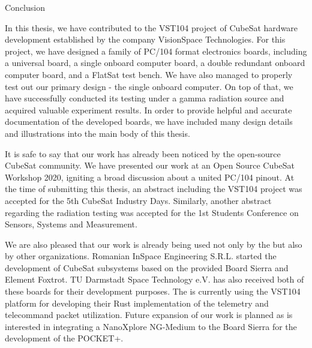 

\chap Conclusion

\quad In this thesis, we have contributed to the VST104 project of CubeSat hardware development established by the company VisionSpace Technologies. For this project, we have designed a family of PC/104 format electronics boards, including a universal board, a single onboard computer board, a double redundant onboard computer board, and a FlatSat test bench. We have also managed to properly test out our primary design - the single onboard computer. On top of that, we have successfully conducted its testing under a gamma radiation source and acquired valuable experiment results. In order to provide helpful and accurate documentation of the developed boards, we have included many design details and illustrations into the main body of this thesis.

It is safe to say that our work has already been noticed by the open-source CubeSat community. We have presented our work at an Open Source CubeSat Workshop 2020, igniting a broad discussion about a united PC/104 pinout. At the time of submitting this thesis, an abstract including the VST104 project was accepted for the 5th  CubeSat Industry Days. Similarly, another abstract regarding the radiation testing was accepted for the 1st Students Conference on Sensors, Systems and Measurement.

We are also pleased that our work is already being used not only by the  but also by other organizations. Romanian InSpace Engineering S.R.L. started the development of CubeSat subsystems based on the provided Board Sierra and Element Foxtrot. TU Darmstadt Space Technology e.V. has also received both of these boards for their development purposes. The  is currently using the VST104 platform for developing their Rust implementation of the telemetry and telecommand packet utilization. Future expansion of our work is planned as  is interested in integrating a NanoXplore NG-Medium  to the Board Sierra for the development of the POCKET+.
